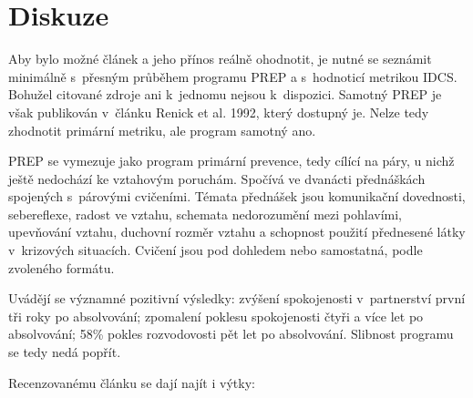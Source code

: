 \vspace{15mm}
\chapter{Diskuze}

Aby bylo možné článek a jeho přínos reálně ohodnotit, je nutné se seznámit
minimálně s~přesným průběhem programu PREP a s~hodnoticí metrikou IDCS. Bohužel
citované zdroje ani k~jednomu nejsou k~dispozici. Samotný PREP je však
publikován v~článku Renick et al. 1992\cite{renick1992prevention}, který
dostupný je. Nelze tedy zhodnotit primární metriku, ale program samotný ano.

PREP se vymezuje jako program primární prevence, tedy cílící na páry, u nichž
ještě nedochází ke vztahovým poruchám. Spočívá ve dvanácti přednáškách spojených
s~párovými cvičeními. Témata přednášek jsou komunikační dovednosti, sebereflexe,
radost ve vztahu, schemata nedorozumění mezi pohlavími, upevňování vztahu,
duchovní rozměr vztahu a schopnost použití přednesené látky v~krizových
situacích. Cvičení jsou pod dohledem nebo samostatná, podle zvoleného formátu.

Uvádějí se významné pozitivní výsledky: zvýšení spokojenosti v~partnerství první
tři roky po absolvování; zpomalení poklesu spokojenosti čtyři a více let po
absolvování; 58\% pokles rozvodovosti pět let po absolvování. Slibnost programu
se tedy nedá popřít.

Recenzovanému článku se dají najít i výtky:

